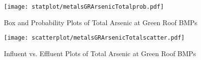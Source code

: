         \begin{figure}[hb]   %
            \centering
            \texttt{[image: statplot/metalsGRArsenicTotalprob.pdf]}
            \caption{Box and Probability Plots of Total Arsenic at Green Roof BMPs}
        \end{figure}         %
        
        
        \begin{figure}[hb]   %
            \centering
            \texttt{[image: scatterplot/metalsGRArsenicTotalscatter.pdf]}
            \caption{Influent vs. Effluent Plots of Total Arsenic at Green Roof BMPs}
        \end{figure}         %
        \clearpage
        